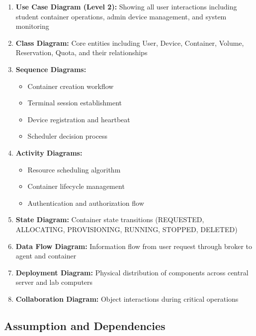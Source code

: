 \documentclass[12pt,a4paper]{article}
\begin{document}
\begin{enumerate}
    \item \textbf{Use Case Diagram (Level 2):} Showing all user interactions including student container operations, admin device management, and system monitoring
    
    \item \textbf{Class Diagram:} Core entities including User, Device, Container, Volume, Reservation, Quota, and their relationships
    
    \item \textbf{Sequence Diagrams:}
    \begin{itemize}
        \item Container creation workflow
        \item Terminal session establishment
        \item Device registration and heartbeat
        \item Scheduler decision process
    \end{itemize}
    
    \item \textbf{Activity Diagrams:}
    \begin{itemize}
        \item Resource scheduling algorithm
        \item Container lifecycle management
        \item Authentication and authorization flow
    \end{itemize}
    
    \item \textbf{State Diagram:} Container state transitions (REQUESTED, ALLOCATING, PROVISIONING, RUNNING, STOPPED, DELETED)
    
    \item \textbf{Data Flow Diagram:} Information flow from user request through broker to agent and container
    
    \item \textbf{Deployment Diagram:} Physical distribution of components across central server and lab computers
    
    \item \textbf{Collaboration Diagram:} Object interactions during critical operations
\end{enumerate}

\subsection{Assumption and Dependencies}
\label{sec:assumptions}
\end{document}
